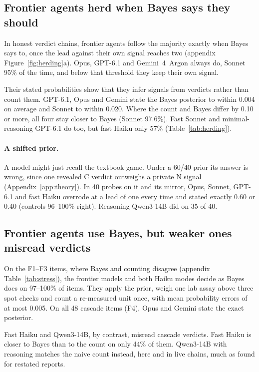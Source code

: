 \documentclass[11pt]{article}
\begin{document}
\subsection{Frontier agents herd when Bayes says they should}
\label{sec:herding}

In honest verdict chains, frontier agents follow the majority exactly when Bayes says to, once the lead against
their own signal reaches two (appendix Figure~\ref{fig:herding}a). Opus, GPT-6.1 and Gemini~4~Argon always do,
Sonnet 95\% of the time, and below that threshold they keep their own signal.

Their stated probabilities show that they infer signals from verdicts rather than count them. GPT-6.1, Opus and
Gemini state the Bayes posterior to within 0.004 on average and Sonnet to within 0.020. Where the count and Bayes
differ by 0.10 or more, all four stay closer to Bayes (Sonnet 97.6\%). Fast Sonnet and minimal-reasoning GPT-6.1 do too,
but fast Haiku only 57\% (Table~\ref{tab:herding}).

\paragraph{A shifted prior.} A model might just recall the textbook game. Under a 60/40 prior its answer is
wrong, since one revealed C verdict outweighs a private N signal (Appendix~\ref{app:theory}). In 40
probes on it and its mirror, Opus, Sonnet, GPT-6.1 and fast Haiku overrode at a lead of one every time and
stated exactly 0.60 or 0.40 (controls 96--100\% right). Reasoning Qwen3-14B did on 35 of 40.

\subsection{Frontier agents use Bayes, but weaker ones misread verdicts}
\label{sec:stress}

On the F1--F3 items, where Bayes and counting disagree (appendix Table~\ref{tab:stress}), the frontier models and
both Haiku modes decide as Bayes does on 97--100\% of items. They apply the prior, weigh one lab assay above three
spot checks and count a re-measured unit once, with mean probability errors of at most 0.005. On all 48 cascade
items (F4), Opus and Gemini state the exact posterior.

Fast Haiku and Qwen3-14B, by contrast, misread cascade verdicts. Fast Haiku is closer to Bayes than to the count
on only 44\% of them. Qwen3-14B with reasoning matches the naive count instead, here and in live chains, much as
\citet{gao2026copies} found for restated reports.
\end{document}

